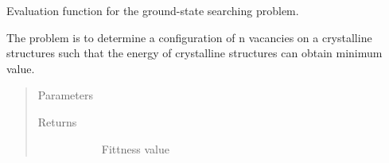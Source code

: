 \documentclass[letterpaper,10pt,english]{sphinxmanual}
\begin{document}
\begin{fulllineitems}
\begin{quote}
\begin{description}
\begin{description}
\end{description}

\end{description}\end{quote}

\begin{fulllineitems}
\label{\detokenize{pygace.examples.hfo2:pygace.examples.hfo2.hfo2_gace.HFO2App.DEFAULT_SETUP}}
\end{fulllineitems}


\begin{fulllineitems}
\label{\detokenize{pygace.examples.hfo2:pygace.examples.hfo2.hfo2_gace.HFO2App.evalEnergy}}
Evaluation function for the ground-state searching problem.

The problem is to determine a configuration of n vacancies
on a crystalline structures such that the energy of crystalline
structures can obtain minimum value.
\begin{quote}\begin{description}
\item[{Parameters}] \leavevmode\begin{description}
\item[{}] \leavevmode
\end{description}

\item[{Returns}] \leavevmode\begin{description}
\item[{}] \leavevmode
Fittness value

\end{description}

\end{description}\end{quote}


\end{fulllineitems}
\end{fulllineitems}
\end{document}
